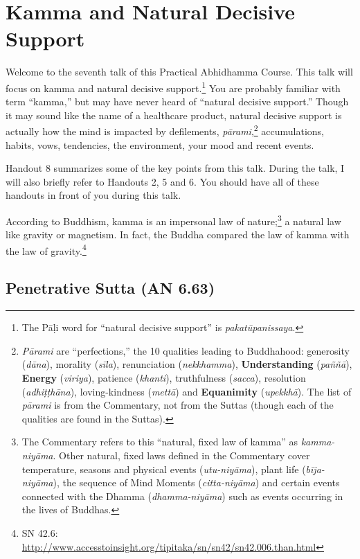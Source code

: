 \section{Kamma and Natural Decisive Support}

Welcome to the seventh talk of this Practical Abhidhamma Course. This talk will focus on kamma and natural decisive support.\footnote{The Pāḷi word for “natural decisive support” is \textit{pakatūpanissaya}.} You are probably familiar with term “kamma,” but may have never heard of “natural decisive support.” Though it may sound like the name of a healthcare product, natural decisive support is actually how the mind is impacted by defilements, \textit{pārami},\footnote{\textit{Pārami} are “perfections,” the 10 qualities leading to Buddhahood: generosity (\textit{dāna}), morality (\textit{sīla}), renunciation (\textit{nekkhamma}), \textbf{Understanding} (\textit{paññā}), \textbf{Energy} (\textit{viriya}), patience (\textit{khanti}), truthfulness (\textit{sacca}), resolution (\textit{adhiṭṭhāna}), loving-kindness (\textit{mettā}) and \textbf{Equanimity} (\textit{upekkhā}). The list of \textit{pārami} is from the Commentary, not from the Suttas (though each of the qualities are found in the Suttas).} accumulations, habits, vows, tendencies, the environment, your mood and recent events.

Handout 8 summarizes some of the key points from this talk. During the talk, I will also briefly refer to Handouts 2, 5 and 6. You should have all of these handouts in front of you during this talk.

According to Buddhism, kamma is an impersonal law of nature;\footnote{The Commentary refers to this “natural, fixed law of kamma” as \textit{kamma-niyāma}. Other natural, fixed laws defined in the Commentary cover temperature, seasons and physical events (\textit{utu-niyāma}), plant life (\textit{bīja-niyāma}), the sequence of Mind Moments (\textit{citta-niyāma}) and certain events connected with the Dhamma (\textit{dhamma-niyāma}) such as events occurring in the lives of Buddhas.} a natural law like gravity or magnetism. In fact, the Buddha compared the law of kamma with the law of gravity.\footnote{SN 42.6: \url{http://www.accesstoinsight.org/tipitaka/sn/sn42/sn42.006.than.html}}

\subsection*{Penetrative Sutta (AN 6.63)}

